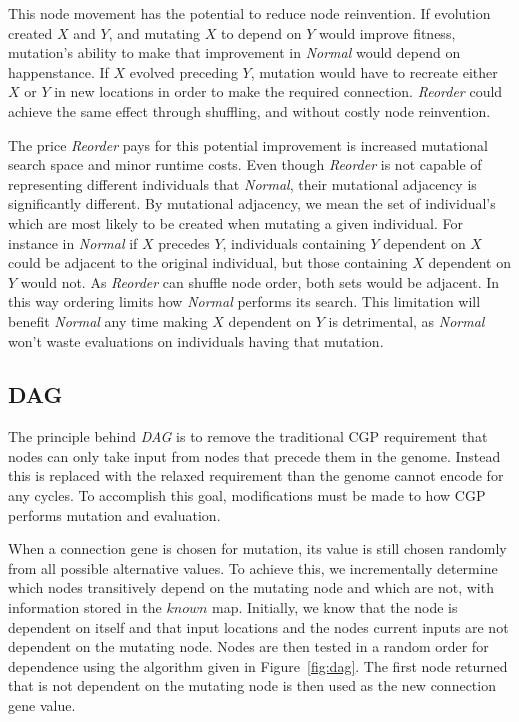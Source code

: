 \documentclass[journal]{IEEEtran}
\begin{document}
This node movement has the potential to reduce node reinvention.  If evolution created
$X$ and $Y$, and mutating $X$ to depend on $Y$ would improve fitness, mutation's
ability to make that improvement in \emph{Normal} would depend on happenstance.  If $X$ evolved
preceding $Y$, mutation would have to recreate either $X$ or $Y$ in new locations
in order to make the required connection.  \emph{Reorder} could achieve the same
effect through shuffling, and without costly node reinvention.

The price \emph{Reorder} pays for this potential improvement is increased mutational search
space and minor runtime costs.  Even though \emph{Reorder} is not capable of representing
different individuals that \emph{Normal}, their mutational adjacency is significantly different.
By mutational adjacency, we mean the set of individual's which are most likely to be created
when mutating a given individual.  For instance in \emph{Normal} if $X$ precedes $Y$, individuals
containing $Y$ dependent on $X$ could be adjacent to the original individual, but those containing
$X$ dependent on $Y$ would not.  As \emph{Reorder} can shuffle node order, both sets would be
adjacent.  In this way ordering limits how \emph{Normal} performs its search.  This limitation
will benefit \emph{Normal} any time making $X$ dependent on $Y$ is detrimental, as
\emph{Normal} won't waste evaluations on individuals having that mutation.


\subsection{DAG}
\label{sec:dag}
The principle behind \emph{DAG} is to remove the traditional CGP requirement that
nodes can only take input from nodes that precede them in the genome.  Instead
this is replaced with the relaxed requirement than the genome cannot encode for
any cycles.  To accomplish this goal, modifications must be made to how CGP
performs mutation and evaluation.

When a connection gene is chosen for mutation, its value is still chosen randomly
from all possible alternative values.  To achieve this, we incrementally determine
which nodes transitively depend on the mutating node and which are not, with
information stored in the $known$ map.  Initially, we know that the node
is dependent on itself and that input locations and the nodes current inputs
are not dependent on the mutating node.  Nodes are then
tested in a random order for dependence using the algorithm given in Figure~\ref{fig:dag}.
The first node returned that is not dependent on the mutating node is then
used as the new connection gene value.
\end{document}
